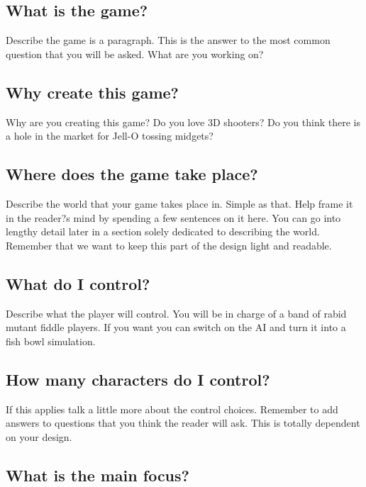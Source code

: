 \documentclass[a4paper]{report}
\begin{document}
		\subsection{What is the game?}

			Describe the game is a paragraph.  This is the answer to the most common question that you will be asked.  What are you working on?

		\subsection{Why create this game?}

			Why are you creating this game?  Do you love 3D shooters?  Do you think there is a hole in the market for Jell-O tossing midgets?

		\subsection{Where does the game take place?}

			Describe the world that your game takes place in.  Simple as that.  Help frame it in the reader?s mind by spending a few sentences on it here.  You can go into lengthy detail later in a section solely dedicated to describing the world.  Remember that we want to keep this part of the design light and readable.

		\subsection{What do I control?}

			Describe what the player will control.  You will be in charge of a band of rabid mutant fiddle players.  If you want you can switch on the AI and turn it into a fish bowl simulation.

		\subsection{How many characters do I control?}

			If this applies talk a little more about the control choices.  Remember to add answers to questions that you think the reader will ask.  This is totally dependent on your design.

		\subsection{What is the main focus?}
\end{document}
